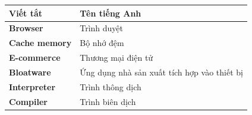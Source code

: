 \documentclass[../LuanVan.tex]{subfiles}
\begin{document}
\begin{longtable}{l p{14cm}}
	\hline
   \textbf{Viết tắt}  & \textbf{Tên tiếng Anh} \\ \hline 
	\textbf{Browser} & Trình duyệt \\
	\textbf{Cache memory} & Bộ nhớ đệm \\
	\textbf{E-commerce} & Thương mại điện tử \\
	\textbf{Bloatware} & Ứng dụng nhà sản xuất tích hợp vào thiết bị \\
	\textbf{Interpreter}  &  Trình thông dịch \\
    \textbf{Compiler}  &  Trình biên dịch \\

    \hline
\end{longtable}
\end{document}
